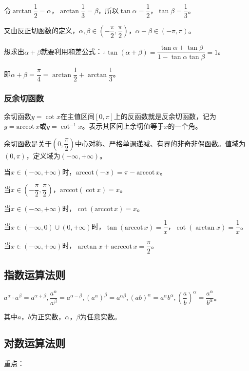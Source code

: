 \documentclass[UTF8, 12pt]{ctexart}
\begin{document}
令$\arctan\dfrac{1}{2}=\alpha$，$\arctan\dfrac{1}{3}=\beta$，所以$\tan\alpha=\dfrac{1}{2}$，$\tan\beta=\dfrac{1}{3}$。

又由反正切函数的定义，$\alpha,\beta\in\left(-\dfrac{\pi}{2},\dfrac{\pi}{2}\right)$，$\alpha+\beta\in(-\pi,\pi)$。

想求出$\alpha+\beta$就要利用和差公式：$\therefore\tan(\alpha+\beta)=\dfrac{\tan\alpha+\tan\beta}{1-\tan\alpha\tan\beta}=1$。

即$\alpha+\beta=\dfrac{\pi}{4}=\arctan\dfrac{1}{2}+\arctan\dfrac{1}{3}$。

\subsubsection{反余切函数}

余切函数$y=\cot x$在主值区间$[0,\pi]$上的反函数就是反余切函数，记为$y=\textrm{arccot}\,x$或$y=\cot^{-1}x$。表示其区间上余切值等于$x$的一个角。

余切函数是关于$\left(0,\dfrac{\pi}{2}\right)$中心对称、严格单调递减、有界的非奇非偶函数。值域为$(0,\pi)$，定义域为$(-\infty,+\infty)$。

当$x\in(-\infty,+\infty)$时，$\textrm{arccot}(-x)=\pi-\textrm{arccot}\,x$。

当$x\in\left(-\dfrac{\pi}{2},\dfrac{\pi}{2}\right)$，$\textrm{arccot}(\cot x)=x$。

当$x\in(-\infty,+\infty)$时，$\cot(\textrm{arccot}\,x)=x$。

当$x\in(-\infty,0)\cup(0,+\infty)$时，$\tan(\textrm{arccot}\,x)=\dfrac{1}{x}$，$\cot(\arctan x)=\dfrac{1}{x}$。

当$x\in(-\infty,+\infty)$时，$\arctan x+\textrm{acrccot}\,x=\dfrac{\pi}{2}$。

\subsection{指数运算法则}

$a^\alpha\cdot a^\beta=a^{\alpha+\beta},\dfrac{a^\alpha}{a^\beta}=a^{\alpha-\beta},(a^\alpha)^\beta=a^{\alpha\beta},(ab)^\alpha=a^\alpha b^\alpha,(\dfrac{a}{b})^\alpha=\dfrac{a^\alpha}{b^\alpha}$。

其中$a$，$b$为正实数，$\alpha$，$\beta$为任意实数。

\subsection{对数运算法则}

重点：
\end{document}
